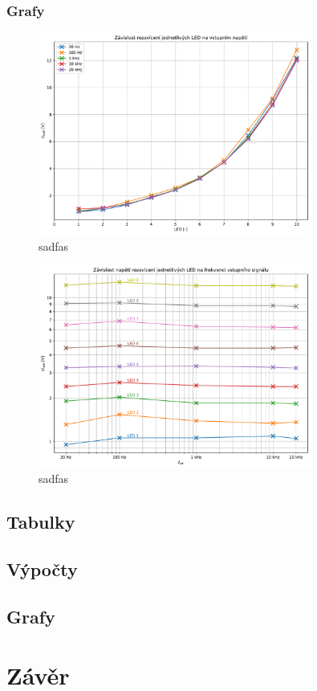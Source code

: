 \documentclass[a4paper, czech]{article}
\begin{document}
\pagebreak

\subsubsection{Grafy}

\begin{figure}[H]
    \centering
    \includegraphics[width=0.8\textwidth]{grafy/graf1.pdf}
    \caption{sadfas}
\end{figure}

\begin{figure}[H]
    \centering
    \includegraphics[width=0.8\textwidth]{grafy/graf2.pdf}
    \caption{sadfas}
\end{figure}

\subsection{Tabulky}

\subsection{Výpočty}

\subsection{Grafy}

\section{Závěr}
\end{document}
